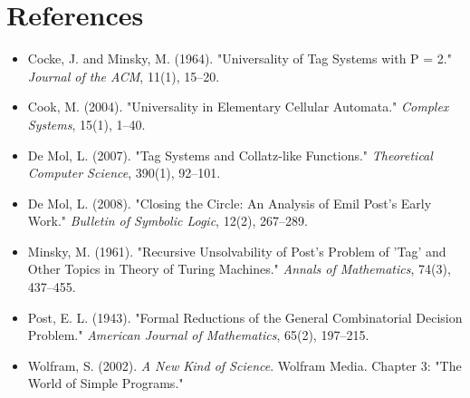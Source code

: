 \section{References}

\begin{itemize}
  \item Cocke, J. and Minsky, M. (1964). "Universality of Tag Systems with P = 2." \textit{Journal of the ACM}, 11(1), 15--20.
  \item Cook, M. (2004). "Universality in Elementary Cellular Automata." \textit{Complex Systems}, 15(1), 1--40.
  \item De Mol, L. (2007). "Tag Systems and Collatz-like Functions." \textit{Theoretical Computer Science}, 390(1), 92--101.
  \item De Mol, L. (2008). "Closing the Circle: An Analysis of Emil Post's Early Work." \textit{Bulletin of Symbolic Logic}, 12(2), 267--289.
  \item Minsky, M. (1961). "Recursive Unsolvability of Post's Problem of 'Tag' and Other Topics in Theory of Turing Machines." \textit{Annals of Mathematics}, 74(3), 437--455.
  \item Post, E. L. (1943). "Formal Reductions of the General Combinatorial Decision Problem." \textit{American Journal of Mathematics}, 65(2), 197--215.
  \item Wolfram, S. (2002). \textit{A New Kind of Science}. Wolfram Media. Chapter 3: "The World of Simple Programs."
\end{itemize}
